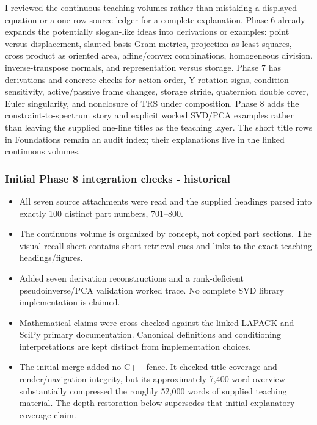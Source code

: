 \hypertarget{appendix-a103e7846d21-scope-audit-of-brief-statements-in-phases-68}{}

I reviewed the continuous teaching volumes rather than mistaking a displayed equation or a one-row source ledger for a complete explanation. Phase 6 already expands the potentially slogan-like ideas into derivations or examples: point versus displacement, slanted-basis Gram metrics, projection as least squares, cross product as oriented area, affine/convex combinations, homogeneous division, inverse-transpose normals, and representation versus storage. Phase 7 has derivations and concrete checks for action order, Y-rotation signs, condition sensitivity, active/passive frame changes, storage stride, quaternion double cover, Euler singularity, and nonclosure of TRS under composition. Phase 8 adds the constraint-to-spectrum story and explicit worked SVD/PCA examples rather than leaving the supplied one-line titles as the teaching layer. The short title rows in Foundations remain an audit index; their explanations live in the linked continuous volumes.

\subsubsection{Initial Phase 8 integration checks - historical}\label{appendix-a103e7846d21-initial-phase-8-integration-checks---historical}

\hypertarget{appendix-a103e7846d21-initial-phase-8-integration-checks---historical}{}

\begin{itemize}
\tightlist
\item
  All seven source attachments were read and the supplied headings parsed into exactly 100 distinct part numbers, 701--800.
\item
  The continuous volume is organized by concept, not copied part sections. The visual-recall sheet contains short retrieval cues and links to the exact teaching headings/figures.
\item
  Added seven derivation reconstructions and a rank-deficient pseudoinverse/PCA validation worked trace. No complete SVD library implementation is claimed.
\item
  Mathematical claims were cross-checked against the linked LAPACK and SciPy primary documentation. Canonical definitions and conditioning interpretations are kept distinct from implementation choices.
\item
  The initial merge added no C++ fence. It checked title coverage and render/navigation integrity, but its approximately 7,400-word overview substantially compressed the roughly 52,000 words of supplied teaching material. The depth restoration below supersedes that initial explanatory-coverage claim.
\end{itemize}

